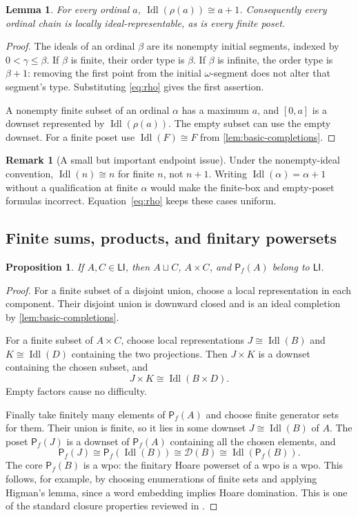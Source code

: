 \documentclass[11pt,letterpaper]{article}
\theoremstyle{teal}
\newtheorem{lemma}[theorem]{Lemma}
\newtheorem{proposition}[theorem]{Proposition}
\theoremstyle{definition}
\newtheorem{remark}[theorem]{Remark}
\newcommand{\Pf}{\mathsf P_{\!f}}
\newcommand{\Down}{\mathcal D}
\newcommand{\Idl}{\operatorname{Idl}}
\newcommand{\LI}{\mathsf{LI}}
\begin{document}
\begin{lemma}\label{lem:ordinal-core}
For every ordinal $a$, $\Idl(\rho(a))\cong a+1$. Consequently every ordinal chain is locally ideal-representable, as is every finite poset.
\end{lemma}
\begin{proof}
The ideals of an ordinal $\beta$ are its nonempty initial segments, indexed by $0<\gamma\leq\beta$. If $\beta$ is finite, their order type is $\beta$. If $\beta$ is infinite, the order type is $\beta+1$: removing the first point from the initial $\omega$-segment does not alter that segment's type. Substituting \eqref{eq:rho} gives the first assertion.

A nonempty finite subset of an ordinal $\alpha$ has a maximum $a$, and $[0,a]$ is a downset represented by $\Idl(\rho(a))$. The empty subset can use the empty downset. For a finite poset use $\Idl(F)\cong F$ from \cref{lem:basic-completions}.
\end{proof}

\begin{remark}[A small but important endpoint issue]
Under the nonempty-ideal convention, $\Idl(n)\cong n$ for finite $n$, not $n+1$. Writing $\Idl(\alpha)=\alpha+1$ without a qualification at finite $\alpha$ would make the finite-box and empty-poset formulas incorrect. Equation~\eqref{eq:rho} keeps these cases uniform.
\end{remark}

\subsection{Finite sums, products, and finitary powersets}
\begin{proposition}\label{prop:closure-simple}
If $A,C\in\LI$, then $A\sqcup C$, $A\times C$, and $\Pf(A)$ belong to $\LI$.
\end{proposition}
\begin{proof}
For a finite subset of a disjoint union, choose a local representation in each component. Their disjoint union is downward closed and is an ideal completion by \cref{lem:basic-completions}.

For a finite subset of $A\times C$, choose local representations $J\cong\Idl(B)$ and $K\cong\Idl(D)$ containing the two projections. Then $J\times K$ is a downset containing the chosen subset, and
\[
 J\times K\cong\Idl(B\times D).
\]
Empty factors cause no difficulty.

Finally take finitely many elements of $\Pf(A)$ and choose finite generator sets for them. Their union is finite, so it lies in some downset $J\cong\Idl(B)$ of $A$. The poset $\Pf(J)$ is a downset of $\Pf(A)$ containing all the chosen elements, and
\[
 \Pf(J)\cong\Pf(\Idl(B))\cong\Down(B)\cong\Idl(\Pf(B)).
\]
The core $\Pf(B)$ is a wpo: the finitary Hoare powerset of a wpo is a wpo. This follows, for example, by choosing enumerations of finite sets and applying Higman's lemma, since a word embedding implies Hoare domination. This is one of the standard closure properties reviewed in \cite{IdealApproach}.
\end{proof}
\end{document}
